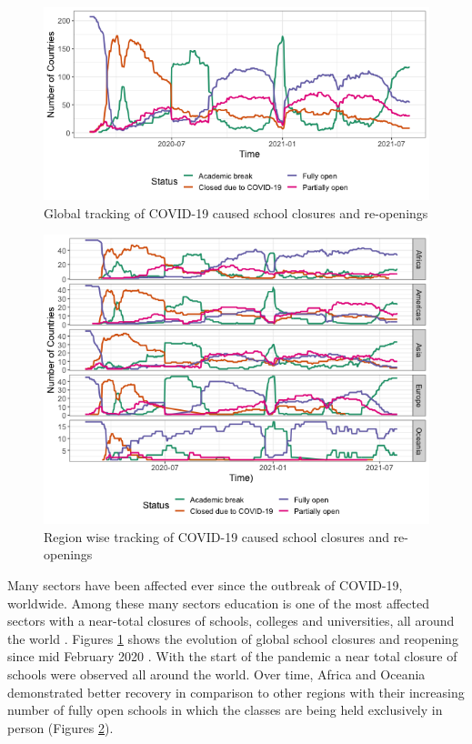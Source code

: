 \documentclass[11pt,a4paper,]{article}
\begin{document}
\begin{figure}[h]

{\centering \includegraphics[width=1\textwidth]{figure/covidImpactWorld-1} 

}

\caption{Global tracking of COVID-19 caused school closures and re-openings}\label{fig:covidImpactWorld}
\end{figure}

\begin{figure}[h]

{\centering \includegraphics[width=1\textwidth]{figure/covidImpactContinent-1} 

}

\caption{Region wise tracking of COVID-19 caused school closures and re-openings}\label{fig:covidImpactContinent}
\end{figure}

Many sectors have been affected ever since the outbreak of COVID-19, worldwide. Among these many sectors education is one of the most affected sectors with a near-total closures of schools, colleges and universities, all around the world \autocite{daniel2020education}. Figures \ref{fig:covidImpactWorld} shows the evolution of global school closures and reopening since mid February 2020 \autocite{unesco2020covid}. With the start of the pandemic a near total closure of schools were observed all around the world. Over time, Africa and Oceania demonstrated better recovery in comparison to other regions with their increasing number of fully open schools in which the classes are being held exclusively in person (Figures \ref{fig:covidImpactContinent}).
\end{document}
